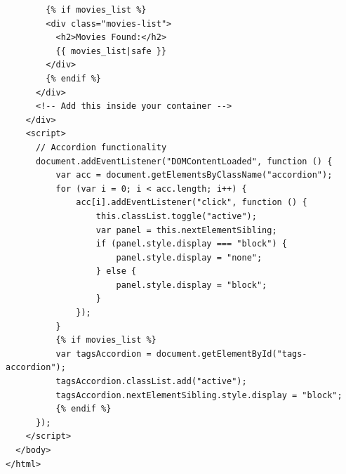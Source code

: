 \documentclass[conference]{IEEEtran}
\begin{document}
\begin{lstlisting}
        {% if movies_list %}
        <div class="movies-list">
          <h2>Movies Found:</h2>
          {{ movies_list|safe }}
        </div>
        {% endif %}
      </div>
      <!-- Add this inside your container -->
    </div>
    <script>
      // Accordion functionality
      document.addEventListener("DOMContentLoaded", function () {
          var acc = document.getElementsByClassName("accordion");
          for (var i = 0; i < acc.length; i++) {
              acc[i].addEventListener("click", function () {
                  this.classList.toggle("active");
                  var panel = this.nextElementSibling;
                  if (panel.style.display === "block") {
                      panel.style.display = "none";
                  } else {
                      panel.style.display = "block";
                  }
              });
          }
          {% if movies_list %}
          var tagsAccordion = document.getElementById("tags-accordion");
          tagsAccordion.classList.add("active");
          tagsAccordion.nextElementSibling.style.display = "block";
          {% endif %}
      });
    </script>
  </body>
</html>

\end{lstlisting}
\end{document}
